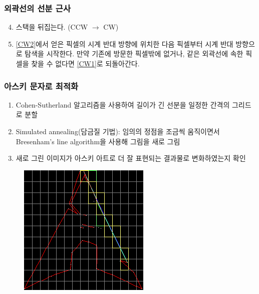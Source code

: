 \documentclass{beamer}
\begin{document}
	\begin{frame}{}
		\frametitle{외곽선의 선분 근사}
		\begin{enumerate}
			\setcounter{enumi}{3}
			\item 스택을 뒤집는다. (CCW $ \rightarrow $ CW)
			\item \ref{CW2}에서 얻은 픽셀의 시계 반대 방향에 위치한 다음 픽셀부터 시계 반대 방향으로 탐색을 시작한다.
			만약 기존에 방문한 픽셀밖에 없거나, 같은 외곽선에 속한 픽셀을 찾을 수 없다면 \ref{CW1}로 되돌아간다.
		\end{enumerate}
	\end{frame}
	\begin{frame}{}
		\frametitle{아스키 문자로 최적화}
		\begin{enumerate}
			\item Cohen-Sutherland 알고리즘을 사용하여 길이가 긴 선분을 일정한 간격의 그리드로 분할\cite{cohen-sutherland}
			\item Simulated annealing(담금질 기법): 임의의 정점을 조금씩 움직이면서 Bresenham's line algorithm을 사용해 그림을 새로 그림\cite{bresenham-line}
			\item 새로 그린 이미지가 아스키 아트로 더 잘 표현되는 결과물로 변화하였는지 확인
		\end{enumerate}	
	\end{frame}
	\begin{frame}
		\begin{figure}
			\centering
			\includegraphics[height=\paperheight]{debug.png}
		\end{figure}
	\end{frame}
\end{document}
